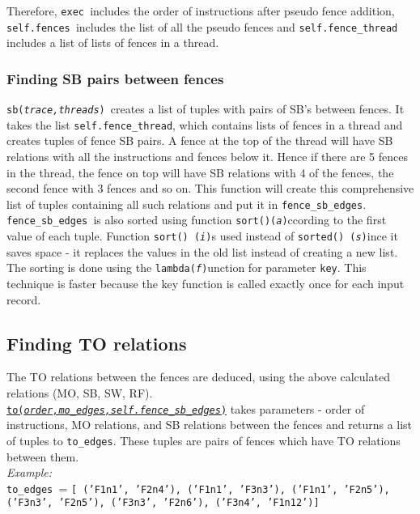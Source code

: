 \documentclass{article}
\newcommand{\var}[1]{\color{OliveGreen} \texttt{#1}\color{black}}
\newcommand{\fun}[2]{\color{Sepia}\texttt{#1(\color{Gray}\textit{#2}\color{Sepia})}\color{black}}
\newcommand{\varinfo}[1]{\scriptsize \texttt{#1} \normalsize}
\begin{document}
Therefore, \var{exec }includes the order of instructions after pseudo fence addition, \var{self.fences }includes the list of all the pseudo fences and \var{self.fence\_thread }includes a list of lists of fences in a thread.

\subsubsection{Finding SB pairs between fences}
\fun{sb}{trace,threads}\ creates a list of tuples with pairs of SB's between fences. It takes the list \var{self.fence\_thread}, which contains lists of fences in a thread and creates tuples of fence SB pairs. A fence at the top of the thread will have SB relations with all the instructions and fences below it. Hence if there are 5 fences in the thread, the fence on top will have SB relations with 4 of the fences, the second fence with 3 fences and so on. This function will create this comprehensive list of tuples containing all such relations and put it in \var{fence\_sb\_edges}.\\

\var{fence\_sb\_edges }is also sorted using function \fun{sort()} according to the first value of each tuple. Function \fun{sort() } is used instead of \fun{sorted() } since it saves space - it replaces the values in the old list instead of creating a new list.\\
The sorting is done using the \fun{lambda} function for parameter \texttt{key}. This technique is faster because the key function is called exactly once for each input record.

\subsection{Finding TO relations}
The TO relations between the fences are deduced, using the above calculated relations (MO, SB, SW, RF).\\
\href{to.tex}{\fun{to}{order,mo\_edges,self.fence\_sb\_edges}} takes parameters - order of instructions, MO relations, and SB relations between the fences and returns a list of tuples to \var{to\_edges}. These tuples are pairs of fences which have TO relations between them.\\
\textit{Example:}\\
\var{to\_edges }= \varinfo{[
('F1n1', 'F2n4'), ('F1n1', 'F3n3'), ('F1n1', 'F2n5'), ('F3n3', 'F2n5'), 
('F3n3', 'F2n6'), ('F3n4', 'F1n12')]}
\end{document}
